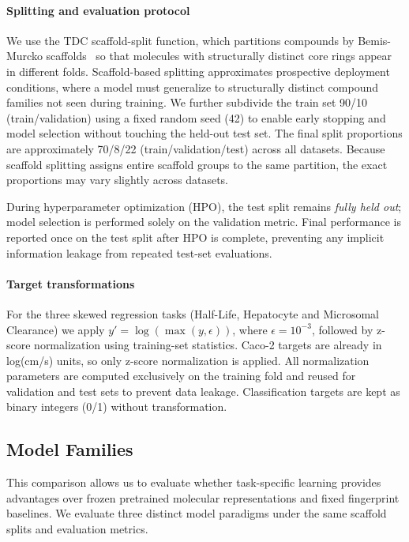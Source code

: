 \documentclass[journal]{IEEEtran}
\begin{document}
\paragraph{Splitting and evaluation protocol}
We use the TDC scaffold-split function, which partitions compounds by Bemis-Murcko scaffolds~\cite{doi:10.1021/jm9602928} so that molecules with structurally distinct core rings appear in different folds. Scaffold-based splitting approximates prospective deployment conditions, where a model must generalize to structurally distinct compound families not seen during training. We further subdivide the train set 90/10 (train/validation) using a fixed random seed (42) to enable early stopping and model selection without touching the held-out test set. The final split proportions are approximately 70/8/22 (train/validation/test) across all datasets.
Because scaffold splitting assigns entire scaffold groups to the same partition, the exact proportions may vary slightly across datasets.

During hyperparameter optimization (HPO), the test split remains \emph{fully held out}; model selection is performed solely on the validation metric. Final performance is reported once on the test split after HPO is complete, preventing any implicit information leakage from repeated test-set evaluations.

\paragraph{Target transformations}
For the three skewed regression tasks (Half-Life, Hepatocyte and Microsomal Clearance) we apply $y' = \log(\max(y, \epsilon))$, where $\epsilon = 10^{-3}$, followed by z-score normalization using training-set statistics. Caco-2 targets are already in log(cm/s) units, so only z-score normalization is applied. All normalization parameters are computed exclusively on the training fold and reused for validation and test sets to prevent data leakage. Classification targets are kept as binary integers (0/1) without transformation.

\subsection{Model Families}
\label{sec:model_families}

This comparison allows us to evaluate whether task-specific learning provides advantages over frozen pretrained molecular representations and fixed fingerprint baselines. We evaluate three distinct model paradigms under the same scaffold splits and evaluation metrics.
\end{document}
